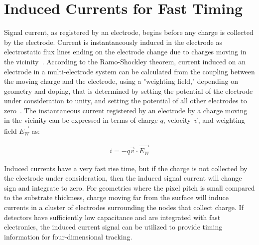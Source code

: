 \section{Induced Currents for Fast Timing}
Signal current, as registered by an electrode, begins before any charge is collected by the electrode.  
Current is instantaneously induced in the electrode as electrostatic flux lines ending on the electrode change due to charges moving in the vicinity~\cite{doi:10.1063/1.1710367}.
According to the Ramo-Shockley theorem, current induced on an electrode in a multi-electrode system can be calculated from the coupling between the moving charge and the electrode, using a "weighting field," depending on geometry and doping, that is determined by setting the potential of the electrode under consideration to unity, and setting the potential of all other electrodes to zero~\cite{1686997}.
The instantaneous current registered by an electrode by a charge moving in the vicinity can be expressed in terms of charge $q$, velocity $\vec{v}$, and weighting field $\vec{E_W}$ as:
\begin{linenomath*}
\begin{align}
i = -q \vec{v} \cdot \vec{E_W}
\end{align}
\end{linenomath*}
Induced currents have a very fast rise time, but if the charge is not collected by the electrode under consideration, then the induced signal current will change sign and integrate to zero.
For geometries where the pixel pitch is small compared to the substrate thickness, charge moving far from the surface will induce currents in a cluster of electrodes surrounding the nodes that collect charge.
If detectors have sufficiently low capacitance and are integrated with fast electronics, the induced current signal can be utilized to provide timing information for four-dimensional tracking.

